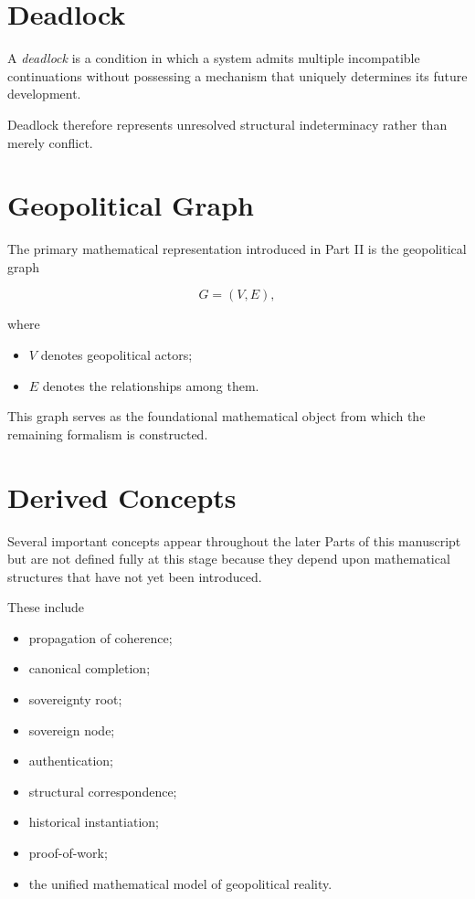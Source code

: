 \documentclass[11pt,openany]{book}
\theoremstyle{plain}
\theoremstyle{definition}
\begin{document}
\section*{Deadlock}

A \emph{deadlock} is a condition in which a system admits multiple incompatible continuations without possessing a mechanism that uniquely determines its future development.

Deadlock therefore represents unresolved structural indeterminacy rather than merely conflict.


\section*{Geopolitical Graph}

The primary mathematical representation introduced in Part II is the geopolitical graph

\[
G=(V,E),
\]

where

\begin{itemize}
\item \(V\) denotes geopolitical actors;
\item \(E\) denotes the relationships among them.
\end{itemize}

This graph serves as the foundational mathematical object from which the remaining formalism is constructed.


\section*{Derived Concepts}

Several important concepts appear throughout the later Parts of this manuscript but are not defined fully at this stage because they depend upon mathematical structures that have not yet been introduced.

These include

\begin{itemize}
\item propagation of coherence;
\item canonical completion;
\item sovereignty root;
\item sovereign node;
\item authentication;
\item structural correspondence;
\item historical instantiation;
\item proof-of-work;
\item the unified mathematical model of geopolitical reality.
\end{itemize}
\end{document}
